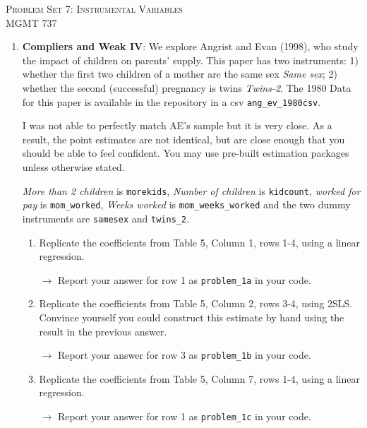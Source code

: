 \documentclass[11pt, a4paper]{article}
\begin{document}
\begin{center}
  {\Large \textsc{Problem Set 7: Instrumental Variables}}\\
  MGMT 737
\end{center}

\begin{enumerate}
\item \textbf{Compliers and Weak IV}: We explore Angrist and Evan (1998), who
  study the impact of children on parents' supply. This paper has two
  instruments: 1) whether the first two children of a mother are the
  same sex \textit{Same sex}; 2) whether the second (successful)
  pregnancy is twins \textit{Twins-2}. The 1980 Data for this paper is
  available in the repository in a csv \texttt{ang\_ev\_1980\.csv}.

  I was not able to perfectly match AE's sample but it is very
  close. As a result, the point estimates are not identical, but are
  close enough that you should be able to feel confident. You may use pre-built estimation packages unless otherwise stated.

  \textit{More than 2 children} is \texttt{morekids}, \textit{Number
    of children} is \texttt{kidcount}, \textit{worked for pay} is
  \texttt{mom\_worked}, \textit{Weeks worked} is
  \texttt{mom\_weeks\_worked} and the two dummy instruments are
  \texttt{samesex} and \texttt{twins\_2}.
  \begin{enumerate}
  \item Replicate the coefficients from Table 5, Column 1, rows 1-4, using a linear regression.
  
        \hspace{10pt} $\rightarrow$ Report your answer for row 1 as \texttt{problem\_1a} in your code.
        
  \item Replicate the coefficients from Table 5, Column 2, rows 3-4,
    using 2SLS. Convince yourself you could construct this estimate by
    hand using the result in the previous answer.
    
        \hspace{10pt} $\rightarrow$ Report your answer for row 3 as \texttt{problem\_1b} in your code.
        
  \item Replicate the coefficients from Table 5, Column 7, rows 1-4, using a linear regression.
  
        \hspace{10pt} $\rightarrow$ Report your answer for row 1 as \texttt{problem\_1c} in your code.
        

\end{enumerate}
\end{enumerate}
\end{document}
